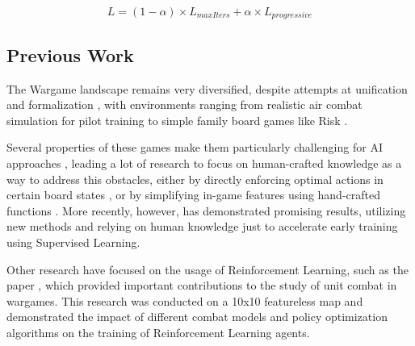 \begin{equation}\label{eq:progressive_loss}
L = (1 - \alpha) \times L_{maxIters} + \alpha \times L_{progressive}
\end{equation}



\subsection{Previous Work}

The Wargame landscape remains very diversified, despite attempts at unification and formalization \cite{formalizing_wargames}, with environments ranging from realistic air combat simulation for pilot training \cite{multi_agent_rl_coordination_air_combat, adaptive_behavior_modeling_air_combat} to simple family board games like Risk \cite{Risk_info}.



Several properties of these games make them particularly challenging for AI approaches \cite{ai_and_wargaming}, leading a lot of research to focus on human-crafted knowledge as a way to address this obstacles, either by directly enforcing optimal actions in certain board states \cite{PK_DQN_paper}, or by simplifying in-game features using hand-crafted functions \cite{MADM_wargames}. More recently, however, \cite{MADDPG_wargames} has demonstrated promising results, utilizing new methods and relying on human knowledge just to accelerate early training using Supervised Learning.

Other research have focused on the usage of Reinforcement Learning, such as the paper \cite{wargame_combat}, which provided important contributions to the study of unit combat in wargames. This research was conducted on a 10x10 featureless map and demonstrated the impact of different combat models and policy optimization algorithms on the training of Reinforcement Learning agents.




